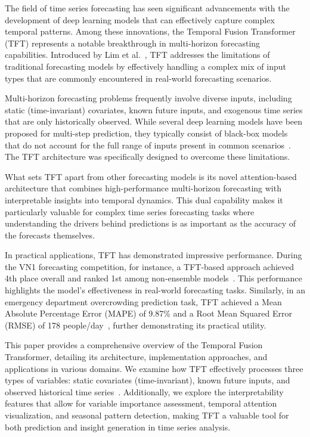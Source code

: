 
The field of time series forecasting has seen significant advancements with the development of deep learning models that can effectively capture complex temporal patterns. Among these innovations, the Temporal Fusion Transformer (TFT) represents a notable breakthrough in multi-horizon forecasting capabilities. Introduced by Lim et al.~\cite{Lim:2019}, TFT addresses the limitations of traditional forecasting models by effectively handling a complex mix of input types that are commonly encountered in real-world forecasting scenarios.

Multi-horizon forecasting problems frequently involve diverse inputs, including static (time-invariant) covariates, known future inputs, and exogenous time series that are only historically observed. While several deep learning models have been proposed for multi-step prediction, they typically consist of black-box models that do not account for the full range of inputs present in common scenarios~\cite{Lim:2019}. The TFT architecture was specifically designed to overcome these limitations.

What sets TFT apart from other forecasting models is its novel attention-based architecture that combines high-performance multi-horizon forecasting with interpretable insights into temporal dynamics. This dual capability makes it particularly valuable for complex time series forecasting tasks where understanding the drivers behind predictions is as important as the accuracy of the forecasts themselves.

In practical applications, TFT has demonstrated impressive performance. During the VN1 forecasting competition, for instance, a TFT-based approach achieved 4th place overall and ranked 1st among non-ensemble models~\cite{AIHorizonForecast:2023}. This performance highlights the model's effectiveness in real-world forecasting tasks. Similarly, in an emergency department overcrowding prediction task, TFT achieved a Mean Absolute Percentage Error (MAPE) of 9.87\% and a Root Mean Squared Error (RMSE) of 178 people/day~\cite{Chang:2022}, further demonstrating its practical utility.

This paper provides a comprehensive overview of the Temporal Fusion Transformer, detailing its architecture, implementation approaches, and applications in various domains. We examine how TFT effectively processes three types of variables: static covariates (time-invariant), known future inputs, and observed historical time series~\cite{Lim:2019}. Additionally, we explore the interpretability features that allow for variable importance assessment, temporal attention visualization, and seasonal pattern detection, making TFT a valuable tool for both prediction and insight generation in time series analysis.